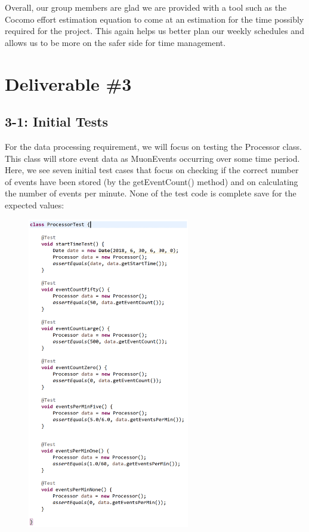 \documentclass[11pt,a4paper]{article}
\begin{document}
Overall, our group members are glad we are provided with a tool such as the Cocomo effort estimation equation to come at an estimation for the time possibly required for the project. This again helps us better plan our weekly schedules and allows us to be more on the safer side for time management.   

\newpage

\section*{Deliverable \#3}

\subsection*{3-1: Initial Tests}

For the data processing requirement, we will focus on testing the Processor class. This class will store event data as MuonEvents occurring over some time period. Here, we see seven initial test cases that focus on checking if the correct number of events have been stored (by the getEventCount() method) and on calculating the number of events per minute. None of the test code is complete save for the expected values:

\begin{figure}[h]
      \includegraphics[width=0.63\textwidth]{codeimg1.png}  
\end{figure}
\end{document}
